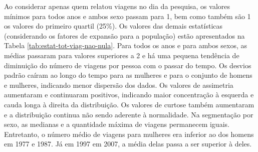 Ao considerar apenas quem relatou viagens no dia da pesquisa, os valores mínimos para todos anos e ambos sexo passam para 1, bem como também são 1 os valores do primeiro quartil (25\%). Os valores das demais estatísticas (considerando os fatores de expansão para a população) estão apresentados na Tabela \ref{tab:estat-tot-viag-nao-nula}.
Para todos os anos e para ambos sexos, as médias passaram para valores superiores a 2 e há uma pequena tendência de diminuição do número de viagens por pessoa com o passar do tempo.
Os desvios padrão caíram ao longo do tempo para as mulheres e para o conjunto de homens e mulheres, indicando menor dispersão dos dados. Os valores de assimetria aumentaram e continuaram positivos, indicando maior concentração à esquerda e cauda longa à direita da distribuição. Os valores de curtose também aumentaram e a distribuição continua não sendo aderente à normalidade.
Na segmentação por sexo, as medianas e a quantidade máxima de viagens permanecem iguais.
Entretanto, o número médio de viagens para mulheres era inferior ao dos homens em 1977 e 1987. Já em 1997 em 2007, a média delas passa a ser superior à deles.


